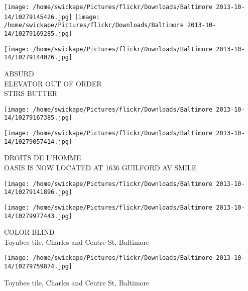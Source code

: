 \documentclass[10pt,letterpaper]{article}
\begin{document}
\texttt{[image: /home/swickape/Pictures/flickr/Downloads/Baltimore 2013-10-14/10279145426.jpg]}
\texttt{[image: /home/swickape/Pictures/flickr/Downloads/Baltimore 2013-10-14/10279169285.jpg]}

\texttt{[image: /home/swickape/Pictures/flickr/Downloads/Baltimore 2013-10-14/10279144026.jpg]}

ABSURD\\
ELEVATOR OUT OF ORDER\\
STIRS BUTTER
\pagebreak

\texttt{[image: /home/swickape/Pictures/flickr/Downloads/Baltimore 2013-10-14/10279167385.jpg]}

\vspace{0.25in}
\texttt{[image: /home/swickape/Pictures/flickr/Downloads/Baltimore 2013-10-14/10279057414.jpg]}

DROITS DE L'HOMME\\
OASIS IS NOW LOCATED AT 1636 GUILFORD AV SMILE
\pagebreak

\texttt{[image: /home/swickape/Pictures/flickr/Downloads/Baltimore 2013-10-14/10279141896.jpg]}

\vspace{0.25in}
\texttt{[image: /home/swickape/Pictures/flickr/Downloads/Baltimore 2013-10-14/10279977443.jpg]}

COLOR BLIND\\
Toynbee tile, Charles and Centre St, Baltimore
\pagebreak

\texttt{[image: /home/swickape/Pictures/flickr/Downloads/Baltimore 2013-10-14/10279759874.jpg]}

Toynbee tile, Charles and Centre St, Baltimore
\pagebreak
\end{document}
